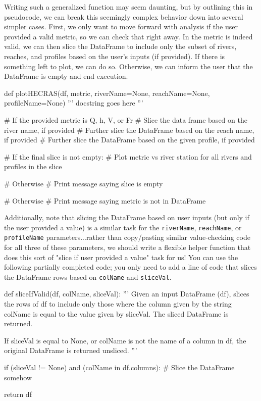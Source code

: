 \documentclass{homework}
\begin{document}
Writing such a generalized function may seem daunting, but by outlining this in pseudocode, we can break this seemingly complex behavior down into several simpler cases. First, we only want to move forward with analysis if the user provided a valid metric, so we can check that right away. In the metric is indeed valid, we can then slice the DataFrame to include only the subset of rivers, reaches, and profiles based on the user's inputs (if provided). If there is something left to plot, we can do so. Otherwise, we can inform the user that the DataFrame is empty and end execution.

\begin{python}
def plotHECRAS(df, metric, riverName=None, reachName=None, profileName=None)
    ''' docstring goes here '''

    # If the provided metric is Q, h, V, or Fr
        # Slice the data frame based on the river name, if provided
        # Further slice the DataFrame based on the reach name, if provided
        # Further slice the DataFrame based on the given profile, if provided

        # If the final slice is not empty:
            # Plot metric vs river station for all rivers and profiles in the slice

        # Otherwise
            # Print message saying slice is empty

    # Otherwise
        # Print message saying metric is not in DataFrame
\end{python}

Additionally, note that slicing the DataFrame based on user inputs (but only if the user provided a value) is a similar task for the \texttt{riverName}, \texttt{reachName}, or \texttt{profileName} parameters...rather than copy/pasting similar value-checking code for all three of these parameters, we should write a flexible helper function that does this sort of "slice if user provided a value" task for us! You can use the following partially completed code; you only need to add a line of code that slices the DataFrame rows based on \texttt{colName} and \texttt{sliceVal}.

\begin{python}
def sliceIfValid(df, colName, sliceVal):
    '''
    Given an input DataFrame (df), slices the rows of df to include only
    those where the column given by the string colName is equal to the 
    value given by sliceVal. The sliced DataFrame is returned.

    If sliceVal is equal to None, or colName is not the name of a column
    in df, the original DataFrame is returned unsliced.
    '''

    if (sliceVal != None) and (colName in df.columns):
        # Slice the DataFrame somehow
    
    return df
\end{python}
\end{document}
